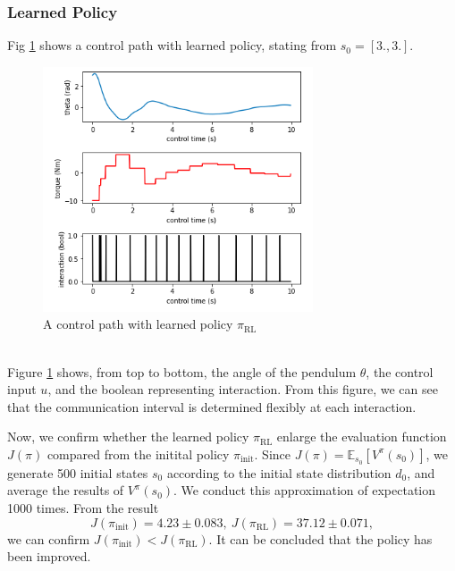 \documentclass[english, dvipdfmx]{ampmt}             %
\newcommand{\expect}{\mathbb{E}}
\begin{document}
\subsubsection{Learned Policy}
Fig \ref{path_l} shows a control path with learned policy, stating from $s_0 = [3., 3.]$.
\begin{figure}[h]
	\centering
 	\includegraphics[width=8cm]{path_l.png}
 	\caption{A control path with learned policy $\pi_{\textrm{RL}}$} \label{path_l}
\end{figure}\\
Figure \ref{path_l} shows, from top to bottom, the angle of the pendulum $\theta$, the control input $u$, and the boolean representing interaction. From this figure, we can see that the communication interval is determined flexibly at each interaction.\par
Now, we confirm whether the learned policy $\pi_{\textrm{RL}}$ enlarge the evaluation function $J(\pi)$ compared from the initital policy $\pi_{\textrm{init}}$. Since $J(\pi) = \expect_{s_0}[V^{\pi}(s_0)]$, we generate 500 initial states $s_0$ according to the initial state distribution $d_0$, and average the results of $V^{\pi}(s_0)$. We conduct this approximation of expectation 1000 times. From the result
\begin{equation}
	J(\pi_{\textrm{init}}) = 4.23 \pm 0.083,~J(\pi_{\textrm{RL}}) = 37.12 \pm 0.071 \label{compare_policy}, 
\end{equation}
we can confirm $J(\pi_{\textrm{init}}) < J(\pi_{\textrm{RL}})$. It can be concluded that the policy has been improved.
\end{document}
